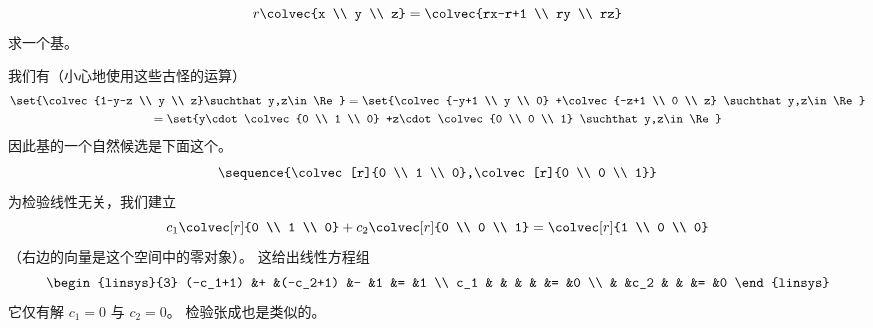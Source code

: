 \begin{exercises}
\begin{equation*}
      r\colvec{x \\ y \\ z}=\colvec{rx-r+1 \\ ry \\ rz}
    \end{equation*}
    求一个基。
    \begin{answer}
      我们有（小心地使用这些古怪的运算）
      \begin{multline*}
        \set{\colvec{1-y-z \\ y \\ z}\suchthat y,z\in\Re}
         =\set{\colvec{-y+1 \\ y \\ 0}
               +\colvec{-z+1 \\ 0 \\ z}
              \suchthat y,z\in\Re}                           \\
         =\set{y\cdot\colvec{0 \\ 1 \\ 0}
               +z\cdot\colvec{0 \\ 0 \\ 1}
              \suchthat y,z\in\Re}
      \end{multline*}
      因此基的一个自然候选是下面这个。
      \begin{equation*}
        \sequence{\colvec[r]{0 \\ 1 \\ 0},\colvec[r]{0 \\ 0 \\ 1}}
      \end{equation*}
      为检验线性无关，我们建立
      \begin{equation*}
         c_1\colvec[r]{0 \\ 1 \\ 0}+c_2\colvec[r]{0 \\ 0 \\ 1}
         =\colvec[r]{1 \\ 0 \\ 0}
      \end{equation*}
      （右边的向量是这个空间中的零对象）。
      这给出线性方程组
      \begin{equation*}
        \begin{linsys}{3}
          (-c_1+1)  &+  &(-c_2+1)  &-  &1  &=  &1  \\
             c_1    &   &          &   &   &=  &0  \\
                    &   &c_2       &   &   &=  &0
        \end{linsys}
      \end{equation*}
      它仅有解 $c_1=0$ 与 $c_2=0$。
      检验张成也是类似的。
   \end{answer}
\end{exercises}














